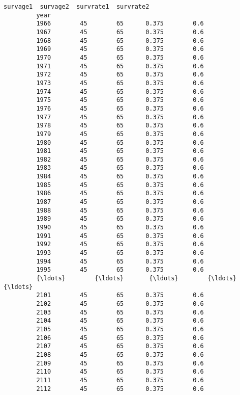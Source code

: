 \documentclass[11pt]{article}
\begin{document}
\begin{Verbatim}[commandchars=\\\{\}]
               survage1  survage2  survrate1  survrate2  
         year                                            
         1966        45        65      0.375        0.6  
         1967        45        65      0.375        0.6  
         1968        45        65      0.375        0.6  
         1969        45        65      0.375        0.6  
         1970        45        65      0.375        0.6  
         1971        45        65      0.375        0.6  
         1972        45        65      0.375        0.6  
         1973        45        65      0.375        0.6  
         1974        45        65      0.375        0.6  
         1975        45        65      0.375        0.6  
         1976        45        65      0.375        0.6  
         1977        45        65      0.375        0.6  
         1978        45        65      0.375        0.6  
         1979        45        65      0.375        0.6  
         1980        45        65      0.375        0.6  
         1981        45        65      0.375        0.6  
         1982        45        65      0.375        0.6  
         1983        45        65      0.375        0.6  
         1984        45        65      0.375        0.6  
         1985        45        65      0.375        0.6  
         1986        45        65      0.375        0.6  
         1987        45        65      0.375        0.6  
         1988        45        65      0.375        0.6  
         1989        45        65      0.375        0.6  
         1990        45        65      0.375        0.6  
         1991        45        65      0.375        0.6  
         1992        45        65      0.375        0.6  
         1993        45        65      0.375        0.6  
         1994        45        65      0.375        0.6  
         1995        45        65      0.375        0.6  
         {\ldots}        {\ldots}       {\ldots}        {\ldots}        {\ldots}  
         2101        45        65      0.375        0.6  
         2102        45        65      0.375        0.6  
         2103        45        65      0.375        0.6  
         2104        45        65      0.375        0.6  
         2105        45        65      0.375        0.6  
         2106        45        65      0.375        0.6  
         2107        45        65      0.375        0.6  
         2108        45        65      0.375        0.6  
         2109        45        65      0.375        0.6  
         2110        45        65      0.375        0.6  
         2111        45        65      0.375        0.6  
         2112        45        65      0.375        0.6  

\end{Verbatim}
\end{document}
